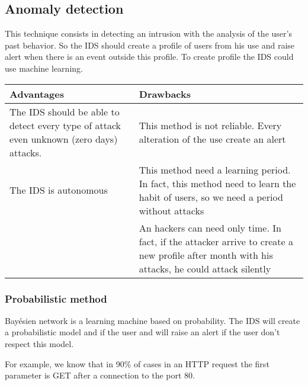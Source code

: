 \subsection{Anomaly detection}

This technique consists in detecting an intrusion with the analysis of the user's past behavior. So the IDS should
create a profile of users from his use and raise alert when there is an event outside this profile. To create
profile the IDS could use machine learning.
~\\

\begin{tabular}{|p{}|p{}|} \hline
Advantages                                                                                                 & Drawbacks \\ \hline The IDS should be able to detect every type of
attack even unknown (zero days) attacks.                                                                   & This method is not reliable. Every
alteration of the use create an alert                                                                                  \\
  \hline The IDS is autonomous                                                                             & This method
need a learning period. In fact, this method need to learn the habit of users,
so we need a period without attacks                                                                                    \\ \hline & An hackers can need only time. In fact,
if the attacker arrive to create a new profile after month with his attacks, he
could attack silently                                                                                                  \\ \hline

\end{tabular}


\subsubsection{Probabilistic method}
Bayésien network is a learning machine based on probability. The IDS will create a probabilistic model and if the
user and will raise an alert if the user don't respect this model.

For example, we know that in 90\% of cases in an HTTP request the first parameter is GET after a connection to the
port 80.


%

